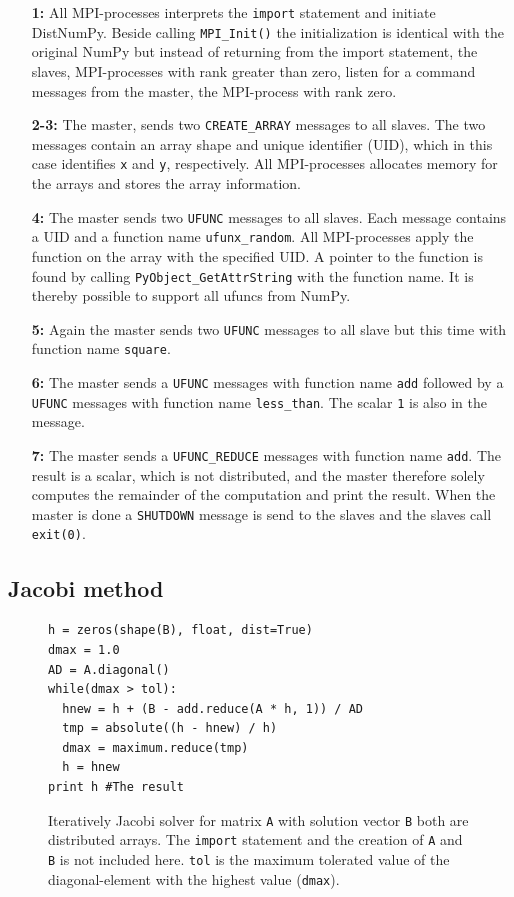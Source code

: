 \documentclass[10pt]{article}
\begin{document}
\begin{enumerate}
\item[\textbf{1:}] All MPI-processes interprets the \texttt{import} statement and initiate DistNumPy. Beside calling \texttt{MPI\_Init()} the initialization is identical with the original NumPy but instead of returning from the import statement, the slaves, MPI-processes with rank greater than zero, listen for a command messages from the master, the MPI-process with rank zero.
\item[\textbf{2-3:}] The master, sends two \texttt{CREATE\_ARRAY} messages to all slaves. The two messages contain an array shape and unique identifier (UID), which in this case identifies \texttt{x} and \texttt{y}, respectively. All MPI-processes allocates memory for the arrays and stores the array information.
\item[\textbf{4:}] The master sends two \texttt{UFUNC} messages to all slaves. Each message contains a UID and a function name \texttt{ufunx\_random}. All MPI-processes apply the function on the array with the specified UID. A pointer to the function is found by calling \texttt{PyObject\_GetAttrString} with the function name. It is thereby possible to support all ufuncs from NumPy.
\item[\textbf{5:}] Again the master sends two \texttt{UFUNC} messages to all slave but this time with function name \texttt{square}.
\item[\textbf{6:}] The master sends a \texttt{UFUNC} messages with function name \texttt{add} followed by a \texttt{UFUNC} messages with function name \texttt{less\_than}. The scalar \texttt{1} is also in the message.
\item[\textbf{7:}] The master sends a \texttt{UFUNC\_REDUCE} messages with function name \texttt{add}. The result is a scalar, which is not distributed, and the master therefore solely computes the remainder of the computation and print the result. When the master is done a \texttt{SHUTDOWN} message is send to the slaves and the slaves call \texttt{exit(0)}.
\end{enumerate}


\subsection{Jacobi method}
\begin{figure}
\begin{lstlisting}
h = zeros(shape(B), float, dist=True)
dmax = 1.0
AD = A.diagonal()
while(dmax > tol):
  hnew = h + (B - add.reduce(A * h, 1)) / AD
  tmp = absolute((h - hnew) / h)
  dmax = maximum.reduce(tmp)
  h = hnew
print h #The result
\end{lstlisting}
 \caption{Iteratively Jacobi solver for matrix \texttt{A} with solution vector \texttt{B} both are distributed arrays. The \texttt{import} statement and the creation of \texttt{A} and \texttt{B} is not included here.
 \texttt{tol} is the maximum tolerated value of the diagonal-element with the highest value (\texttt{dmax}).}
 \label{lst:jocobi}
\end{figure}
\end{document}
